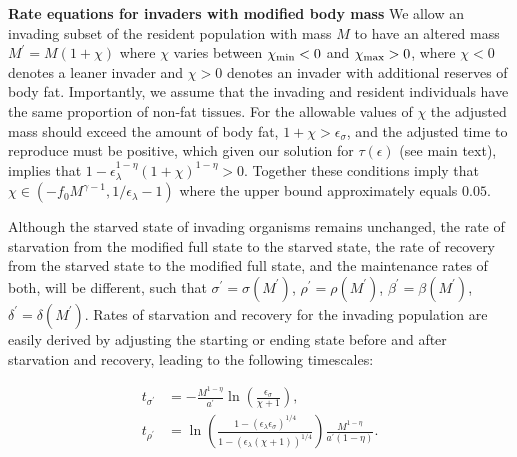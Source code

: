 \documentclass[twocolumn,preprintnumbers,amsmath,amssymb,superscriptaddress]{revtex4}
\begin{document}
\begin{bibunit}[unsrt]
\begin{table}[h]
\begin{center}
\begin{tabular}{p{3.8cm} c p{2.2cm} p{1.4cm}}
   
   

   \hline
    \end{tabular}
    \end{center}
   \end{table}



{\bf Rate equations for invaders with modified body mass}
We allow an invading subset of the resident population with mass $M$ to have an altered mass $M^\prime = M(1+\chi)$ where $\chi$ varies between $\chi_{\rm min} <0$ and $\chi_{\rm max}>0$, where $\chi<0$ denotes a leaner invader and $\chi > 0$ denotes an invader with additional reserves of body fat.
Importantly, we assume that the invading and resident individuals have the same proportion of non-fat tissues.
For the allowable values of $\chi$ the adjusted mass should exceed the amount of body fat, $1+\chi>\epsilon_{\sigma}$, and the adjusted time to reproduce must be positive, which given our solution for $\tau(\epsilon)$ (see main text), implies that $1-\epsilon_{\lambda}^{1-\eta}\left(1+\chi\right)^{1-\eta}>0$.
Together these conditions imply that  $\chi\in(-f_0M^{\gamma-1},1/\epsilon_{\lambda}-1)$ where the upper bound approximately equals $0.05$.

Although the starved state of invading organisms remains unchanged, the rate of starvation from the modified full state to the starved state, the rate of recovery from the starved state to the modified full state, and the maintenance rates of both, will be different, such that $\sigma^\prime = \sigma(M^\prime)$, $\rho^\prime = \rho(M^\prime)$, $\beta^\prime = \beta(M^\prime)$, $\delta^\prime = \delta(M^\prime)$.
Rates of starvation and recovery for the invading population are easily derived by adjusting the starting or ending state before and after starvation and recovery, leading to the following timescales:

\begin{align}
t_{\sigma^\prime} &= -\frac{M^{1-\eta}}{a^{\prime}}\ln \left(\frac{\epsilon_\sigma}{\chi +1}\right), \\ \nonumber
t_{\rho^\prime} &= \ln \left(\frac{1-(\epsilon_\lambda \epsilon_\sigma)^{1/4}}{1-( \epsilon_\lambda(\chi +1))^{1/4}}\right)\frac{M^{1-\eta}}{a^{\prime}\left(1-\eta\right)}.
\end{align}



\end{bibunit}
\end{document}
